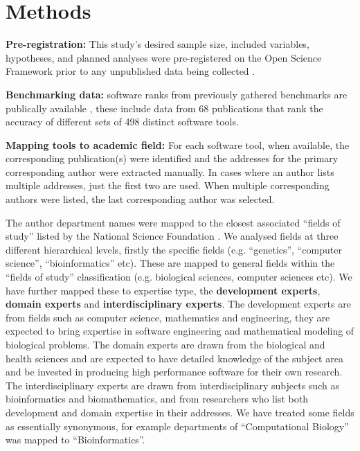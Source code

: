 \documentclass[fleqn,10pt,doc,onecolumn]{SelfArx}%
\begin{document}
\section*{Methods}

\textbf{Pre-registration:} This study's desired sample size, included variables, hypotheses, and
planned analyses were pre-registered on the Open Science Framework
prior to any unpublished data being collected \cite{gardner2024}.

\textbf{Benchmarking data:} software ranks from previously gathered
benchmarks are publically available \cite{Gardner:2022}, these include data from
68 publications that rank the accuracy of different sets of 498
distinct software tools.

\textbf{Mapping tools to academic field:} For each software tool, when
available, the corresponding publication(s) were identified and the
addresses for the primary corresponding author were extracted
manually. In cases where an author lists multiple addresses, just the
first two are used. When multiple corresponding authors were listed,
the last corresponding author was selected.

The author department names were mapped to the closest associated
``fields of study'' listed by the National Science Foundation
\cite{fields2014}. We analysed fields at three different hierarchical
levels, firstly the specific fields (e.g. ``genetics'', ``computer
science'', ``bioinformatics'' etc). These are mapped to general fields
within the ``fields of study'' classification (e.g. biological
sciences, computer sciences etc). We have further mapped these to
expertise type, the \textbf{development experts}, \textbf{domain
  experts} and \textbf{interdisciplinary experts}. The development
experts are from fields such as computer science, mathematics and
engineering, they are expected to bring expertise in software
engineering and mathematical modeling of biological problems. The
domain experts are drawn from the biological and health sciences and
are expected to have detailed knowledge of the subject area and be
invested in producing high performance software for their own
research. The interdisciplinary experts are drawn from
interdisciplinary subjects such as bioinformatics and biomathematics,
and from researchers who list both development and domain expertise in
their addresses. We have treated some fields as essentially
synonymous, for example departments of ``Computational Biology'' was
mapped to ``Bioinformatics''.
\end{document}
